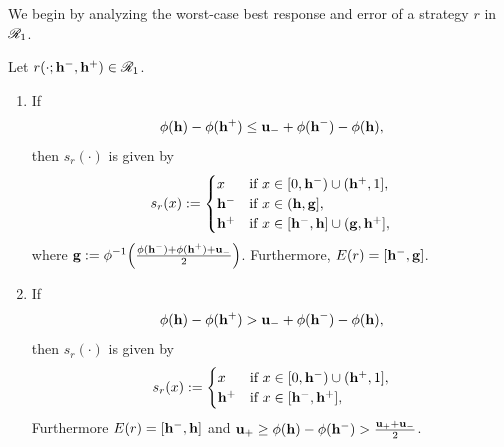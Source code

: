 We begin by analyzing the worst-case best response and error of a strategy $r$ in $\mathscr{R}_1$.
\begin{lem}\label{lem:Best response r1}
	Let $r(\cdot;\mathbf{h^{-}},\mathbf{h^{+}}) \in \mathscr{R}_1$.
	\begin{enumerate}[label=(\alph*)]
		\item If \[\phi(\mathbf{h}) - \phi(\mathbf{h^{+}}) \leq \mathbf{u_-} + \phi(\mathbf{h^{-}}) - \phi(\mathbf{h}),\]
			then $s_r(\cdot)$ is given by
		\begin{equation*}
			s_r(x) := \begin{cases}
				x & \text{if } x \in [0,\mathbf{h^{-}}) \cup (\mathbf{h^{+}},1], \\
				\mathbf{h^{-}} & \text{if } x \in (\mathbf{h},\mathbf{g}], \\
				\mathbf{h^{+}} & \text{if } x \in [\mathbf{h^{-}},\mathbf{h}] \cup (\mathbf{g},\mathbf{h^{+}}],
			\end{cases}
		\end{equation*}
		where $\mathbf{g} := \phi^{-1}\Big(\frac{\phi(\mathbf{h^{-}}) + \phi(\mathbf{h^{+}}) + \mathbf{u_-}}{2}\Big)$. Furthermore, $E(r) = [\mathbf{h^{-}},\mathbf{g}]$.
		\item If \[\phi(\mathbf{h}) - \phi(\mathbf{h^{+}}) > \mathbf{u_-} + \phi(\mathbf{h^{-}}) - \phi(\mathbf{h}),\]
		then $s_r(\cdot)$ is given by
		\begin{equation*}
			s_r(x) := \begin{cases}
				x & \text{if } x \in [0,\mathbf{h^{-}}) \cup (\mathbf{h^{+}},1], \\
				\mathbf{h^{+}} & \text{if } x \in [\mathbf{h^{-}},\mathbf{h^{+}}],
			\end{cases}
		\end{equation*}
\noindent Furthermore $E(r) = [\mathbf{h^{-}},\mathbf{h}]$ and $\mathbf{u_+} \geq \phi(\mathbf{h}) - \phi(\mathbf{h^{-}}) > \frac{\mathbf{u_+} + \mathbf{u_-}}{2}$.
	\end{enumerate}
\end{lem}


